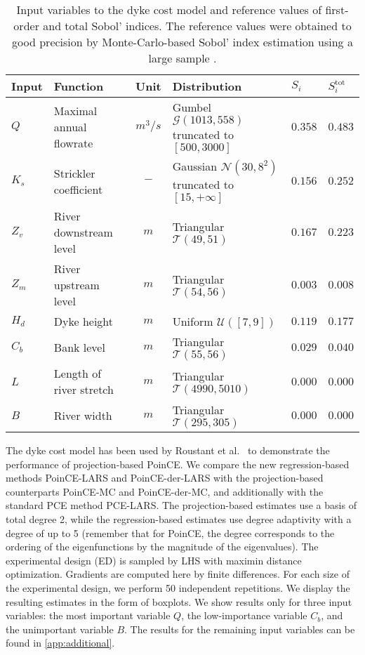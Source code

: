 \documentclass[a4paper,11pt]{article}
\newcommand{\cn}{{\mathcal N}}
\newcommand{\cu}{{\mathcal U}}
\renewcommand{\citep}[2][]{\cite[#1]{#2}}
\renewcommand{\citet}[2][]{\cite[#1]{#2}}
\theoremstyle{definition}
\theoremstyle{remark}
\theoremstyle{theorem}
\begin{document}
\begin{table}[htbp]
	\caption{Input variables to the dyke cost model \citep{ioolem15,rougam20} and reference values of first-order and total Sobol' indices. The reference values were obtained to good precision by Monte-Carlo-based Sobol' index estimation using a large sample \citep{rougam20}.}
	\label{tab:flood_params}
	\centering
	\begin{tabular}{llcp{5cm}ll}
		\hline
		Input & Function & Unit & Distribution & $S_i$ & $S_i^\text{tot}$ \\
		\hline
		$Q$ & Maximal annual flowrate & $\si{m^3/s}$ & 
		Gumbel $\mathcal{G}(1013,558)$ \newline truncated to $[500, 3000]$ 
		& $0.358$ & $0.483$ \\
		$K_s$ & Strickler coefficient & $-$ & 
		Gaussian $\cn(30, 8^2)$ \newline truncated to $[15, +\infty]$ 
		& $0.156$ & $0.252$ \\
		$Z_v$ & River downstream level & $\si{m}$ &
		Triangular $\mathcal{T}(49, 51)$
		& $0.167$ & $0.223$ \\
		$Z_m$ & River upstream level & $\si{m}$ &
		Triangular $\mathcal{T}(54,56)$ 
		& $0.003$ & $0.008$ \\
		$H_d$ & Dyke height & $\si{m}$ &
		Uniform $\cu([7,9])$
		& $0.119$ & $0.177$ \\
		$C_b$ & Bank level & $\si{m}$ & 
		Triangular $\mathcal{T}(55,56)$
		& $0.029$ & $0.040$ \\
		$L$ & Length of river stretch & $\si{m}$ &
		Triangular $\mathcal{T}(4990,5010)$
		& $0.000$ & $0.000$ \\
		$B$ & River width & $\si{m}$ &
		Triangular $\mathcal{T}(295,305)$
		& $0.000$ & $0.000$ \\
		
		\hline
	\end{tabular}
\end{table}

The dyke cost model has been used by Roustant et al.~\citet{rougam20} to demonstrate the performance of projection-based PoinCE. We compare the new regression-based methods PoinCE-LARS and PoinCE-der-LARS with the projection-based counterparts PoinCE-MC and PoinCE-der-MC, and additionally with the standard PCE method PCE-LARS.
The projection-based estimates use a basis of total degree 2, while the regression-based estimates use degree adaptivity with a degree of up to 5 (remember that for PoinCE, the degree corresponds to the ordering of the eigenfunctions by the magnitude of the eigenvalues).
The experimental design (ED) is sampled by LHS with maximin distance optimization.
Gradients are computed here by finite differences.
For each size of the experimental design, we perform 50 independent repetitions. We display the resulting estimates in the form of boxplots.
We show results only for three input variables: the most important variable $Q$, the low-importance variable $C_b$, and the unimportant variable $B$. The results for the remaining input variables can be found in \cref{app:additional}.
\end{document}
